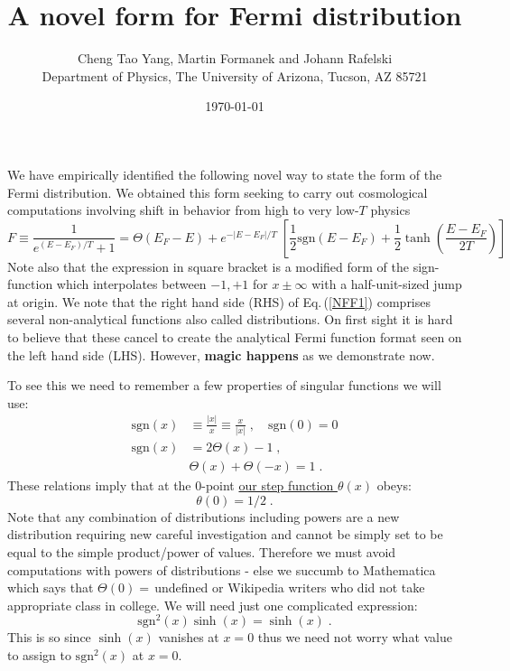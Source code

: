 \documentclass[12pt]{article}
\title{A novel form for Fermi distribution}
\author{Cheng Tao Yang, Martin Formanek and Johann Rafelski\\
{\small Department of Physics, The University of Arizona, Tucson, AZ 85721}}
\date{\today}
\begin{document}
\maketitle
We have empirically identified the following novel way to state the form of the Fermi distribution. We obtained this form seeking to carry out cosmological computations involving shift in behavior from high to very low-$T$ physics 
\begin{equation}\label{NFF1}
F\equiv \frac{1}{e^{ (E-E_F)/T} +1}=%
\Theta(E_F - E) +  e^{ - |E-E_F|/T } %
\; \left[\frac{1}{2}\mathrm{sgn}\left({E-E_F}\right) 
 +\frac{1}{2}\tanh\left(\frac{E-E_F}{2T}\right)\right]
\end{equation}
Note also that the expression in square bracket is a modified form of the sign-function which interpolates between $-1,+1$ for $x\pm \infty$ with a half-unit-sized jump at origin.  We note  that the right hand side (RHS) of Eq.\,(\ref{NFF1}) comprises several non-analytical functions also called distributions. On first sight it is hard to believe that  these   cancel to create the analytical Fermi function format seen on the left hand side (LHS). However, {\bf magic happens} as we demonstrate now. 

To see this we need to remember a few properties of singular functions we will use: 
\begin{align}\label{NFF2a}
\mathrm{sgn}(x)&%
\equiv  \frac{|x|}{x}\equiv \frac{x}{|x|}\;,
   \quad \mathrm{sgn}(0)=0\\[8pt]
 \label{NFF2b}
 \mathrm{sgn}(x)&=2\Theta(x)-1\;,\\[8pt]
\label{NFF2c}
 &\Theta(x)+\Theta(-x)=1\;.
 \end{align}
 These relations  imply that at the $0$-point \underline{our step function  $\theta(x)$} obeys:
 \begin{equation}\label{NFF3}
 \theta(0)=1/2\;.%
 \end{equation}
Note that any combination of distributions including powers are a new distribution requiring new careful investigation and cannot be simply set to be  equal to the simple product/power of values. Therefore we must avoid computations with powers of distributions - else we succumb to Mathematica which says that $\Theta(0)=$\,undefined or Wikipedia writers who did not take appropriate class in college. We will need just one complicated expression:
\begin{equation}\label{NFFa1}
\mathrm{sgn}^{2}(x)\sinh(x)=\sinh(x)\;.
 \end{equation}
This is so since $\sinh(x)$  vanishes  at $x=0$ thus we need not worry what value to assign to $\mathrm{sgn}^{2}(x)$ at $x=0$.  
\end{document}

